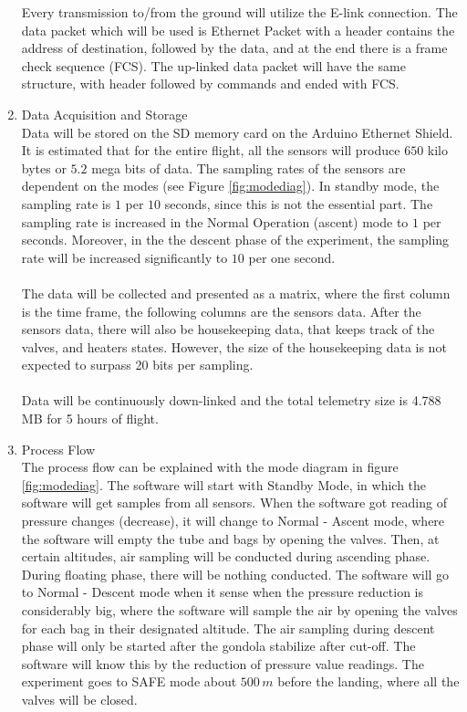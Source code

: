 \documentclass[a4paper,12pt,twoside]{article}
\begin{document}
\begin{enumerate}[label=(\alph*)]
Every transmission to/from the ground will utilize the E-link connection. The data packet which will be used is Ethernet Packet with a header contains the address of destination, followed by the data, and at the end there is a frame check sequence (FCS). The up-linked data packet will have the same structure, with header followed by commands and ended with FCS.
\item{Data Acquisition and Storage}\\
Data will be stored on the SD memory card on the Arduino Ethernet Shield. It is estimated that for the entire flight, all the sensors will produce $650$ kilo bytes or $5.2$ mega bits of data. The sampling rates of the sensors are dependent on the modes (see Figure \ref{fig:modediag}). In standby mode, the sampling rate is $1$ per $10$ seconds, since this is not the essential part. The sampling rate is increased in the Normal Operation (ascent) mode to $1$ per seconds. Moreover, in the the descent phase of the experiment, the sampling rate will be increased significantly to $10$ per one second.\\
\\
The data will be collected and presented as a matrix, where the first column is the time frame, the following columns are the sensors data. After the sensors data, there will also be housekeeping data, that keeps track of the valves, and heaters states. However, the size of the housekeeping data is not expected to surpass 20 bits per sampling.\\
\\
Data will be continuously down-linked and the total telemetry size is 4.788 MB for 5 hours of flight.
\item{Process Flow}\\
The process flow can be explained with the mode diagram in figure \ref{fig:modediag}. The software will start with Standby Mode, in which the software will get samples from all sensors. When the software got reading of pressure changes (decrease), it will change to Normal - Ascent mode, where the software will empty the tube and bags by opening the valves. Then, at certain altitudes, air sampling will be conducted during ascending phase. During floating phase, there will be nothing conducted. The software will go to Normal - Descent mode when it sense when the pressure reduction is considerably big, where the software will sample the air by opening the valves for each bag in their designated altitude. The air sampling during descent phase will only be started after the gondola stabilize after cut-off. The software will know this by the reduction of pressure value readings. The experiment goes to SAFE mode about $500 \, m$ before the landing, where all the valves will be closed. 

\end{enumerate}
\end{document}
